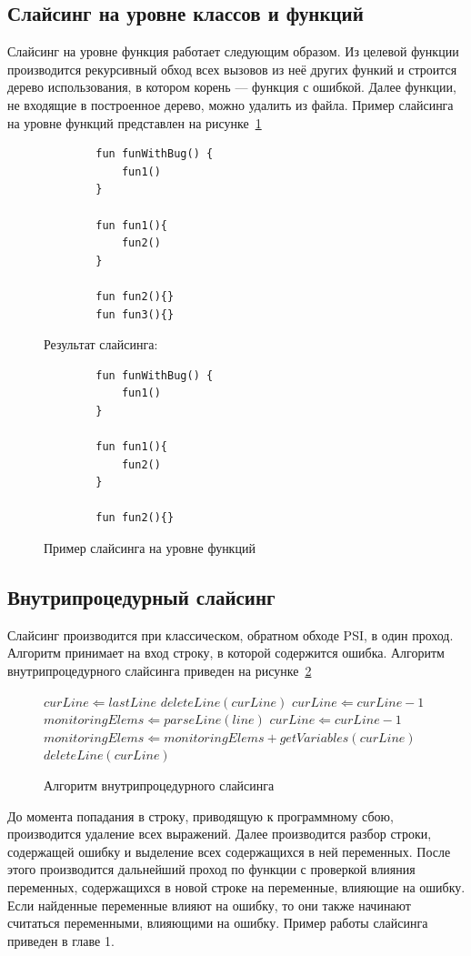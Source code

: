 \subsection{Слайсинг на уровне классов и функций}
Слайсинг на уровне функция работает следующим образом. Из целевой функции производится рекурсивный обход всех вызовов из неё других функий и строится дерево использования, в котором корень --- функция с ошибкой. Далее функции, не входящие в построенное дерево, можно удалить из файла. Пример слайсинга на уровне функций представлен на рисунке~\ref{funslicing}
\begin{figure}
	\begin{lstlisting}
		fun funWithBug() {
			fun1()
		}
		
		fun fun1(){
			fun2()		
		}
		
		fun fun2(){}
		fun fun3(){}
	\end{lstlisting}
	Результат слайсинга:
	\begin{lstlisting}
		fun funWithBug() {
			fun1()
		}
		
		fun fun1(){
			fun2()		
		}
		
		fun fun2(){}
	\end{lstlisting}
	\caption{\label{funslicing}Пример слайсинга на уровне функций}
\end{figure}
\subsection{Внутрипроцедурный слайсинг}
Слайсинг производится при классическом, обратном обходе PSI, в один проход. Алгоритм принимает на вход строку, в которой содержится ошибка. Алгоритм внутрипроцедурного слайсинга приведен на рисунке~\ref{alg:interproceduralslicing}
\begin{figure}
\begin{algorithmic}[1]
\STATE $curLine \Leftarrow lastLine$
	\STATE $deleteLine(curLine)$
	\STATE $curLine \Leftarrow curLine - 1$
\ENDWHILE
\STATE $monitoringElems \Leftarrow parseLine(line)$
\STATE $curLine \Leftarrow curLine - 1$
		\STATE $monitoringElems \Leftarrow monitoringElems + getVariables(curLine)$ 
	\ELSE 
		\STATE $deleteLine(curLine)$ 
	\ENDIF
\ENDWHILE
\end{algorithmic}
\caption{\label{alg:interproceduralslicing}Алгоритм внутрипроцедурного слайсинга}
\end{figure}


До момента попадания в строку, приводящую к программному сбою, производится удаление всех выражений. Далее производится разбор строки, содержащей ошибку и выделение всех содержащихся в ней переменных. После этого производится дальнейший проход по функции с проверкой влияния переменных, содержащихся в новой строке на переменные, влияющие на ошибку. Если найденные переменные влияют на ошибку, то они также начинают считаться переменными, влияющими на ошибку. Пример работы слайсинга приведен в главе 1.



